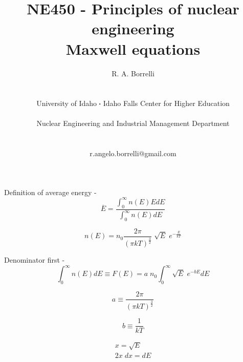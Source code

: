 \documentclass[11pt,a4paper]{article}
\newcommand*\sq{\mathbin{\vcenter{\hbox{\rule{.3ex}{.3ex}}}}} %
\begin{document}
\begin{titlepage}
    \title{
        NE450 - Principles of nuclear engineering\\
        Maxwell equations\\
    }
    \author{
        R. A. Borrelli
        \\ \\ \\
        University of Idaho $\sq$ Idaho Falls Center for Higher Education
        \\ \\
        Nuclear Engineering and Industrial Management Department
        \\ \\ \\
        r.angelo.borrelli@gmail.com
    }
\clearpage %
\maketitle
\thispagestyle{empty} %
\end{titlepage}

\noindent Definition of average energy - 
\begin{equation}
    \overline{E} = \frac{\int_0^{\infty} n(E)EdE}{\int_0^{\infty} n(E)dE}
\end{equation}

\begin{equation}
    n(E) = n_0 \frac{2\pi}{(\pi kT)^{\frac{3}{2}}} \; \sqrt{E} \; e^{-\frac{E}{kT}}
\end{equation}

\noindent Denominator first - 
\begin{equation}
    \int_0^{\infty} n(E)dE \equiv F(E) = a \; n_0 \int_0^{\infty} \sqrt{E} \; e^{-b E} dE 
\end{equation}

\begin{equation*}
    a \equiv \frac{2\pi}{(\pi kT)^{\frac{3}{2}}} 
\end{equation*}

\begin{equation*}
    b \equiv \frac{1}{kT}
\end{equation*}

\begin{equation*}
    \begin{gathered}
        x  = \sqrt{E}\\
        2x \; dx = dE
    \end{gathered}
\end{equation*}
\end{document}
